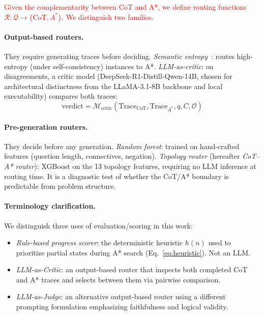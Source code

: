 \documentclass[11pt]{article}
\begin{document}
\textcolor{red}{Given the complementarity between CoT and A*, we define routing functions $\mathcal{R}: \mathcal{Q} \to \{\text{CoT}, A^*\}$. We distinguish two families.}

\paragraph{Output-based routers.} They require generating traces before deciding. \emph{Semantic entropy}~\citep{kossen2024semanticentropyprobesrobust}: routes high-entropy (under self-consistency) instances to A*. \emph{LLM-as-critic}: on disagreements, a critic model (DeepSeek-R1-Distill-Qwen-14B, chosen for architectural distinctness from the LLaMA-3.1-8B backbone and local executability) compares both traces:
\begin{equation}
\text{verdict} = \mathcal{M}_{\text{critic}}(\text{Trace}_{\text{CoT}}, \text{Trace}_{A^*}, q, C, \mathcal{O})
\label{eq:critic}
\end{equation}

\paragraph{Pre-generation routers.} They decide before any generation. \emph{Random forest}: trained on hand-crafted features (question length, connectives, negation). \emph{Topology router} (hereafter \emph{CoT--A* router}): XGBoost on the 13 topology features, requiring no LLM inference at routing time. It is a diagnostic test of whether the CoT/A* boundary is predictable from problem structure.

\paragraph{Terminology clarification.} We distinguish three uses of evaluation/scoring in this work:
\begin{itemize}[nosep,leftmargin=*]
\item \emph{Rule-based progress scorer}: the deterministic heuristic $h(n)$ used to prioritize partial states during A* search (Eq.~\ref{eq:heuristic}). Not an LLM.
\item \emph{LLM-as-Critic}: an output-based router that inspects both completed CoT and A* traces and selects between them via pairwise comparison.
\item \emph{LLM-as-Judge}: an alternative output-based router using a different prompting formulation emphasizing faithfulness and logical validity.
\end{itemize}
\end{document}
